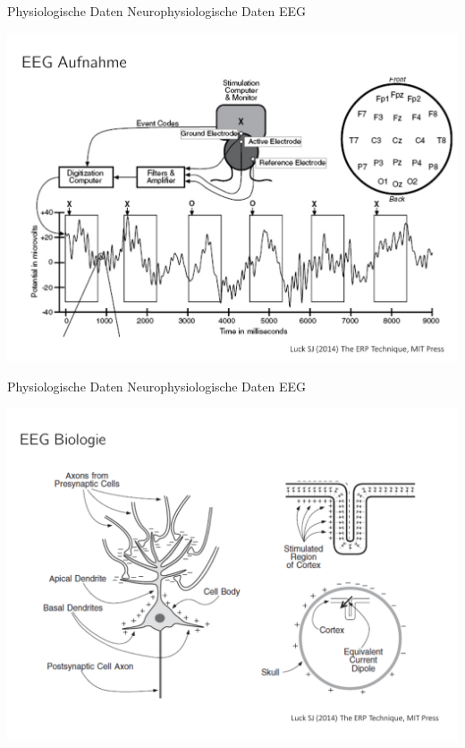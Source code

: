 \documentclass[
  8pt,
  ignorenonframetext,
]{beamer}
\begin{document}
\begin{frame}{Physiologische Daten}
\protect\hypertarget{physiologische-daten-4}{}
Neurophysiologische Daten \textbar{} EEG

\begin{center}\includegraphics[width=0.8\linewidth]{3_Abbildungen/pfm_3_eeg_aufnahme} \end{center}
\end{frame}

\begin{frame}{Physiologische Daten}
\protect\hypertarget{physiologische-daten-5}{}
Neurophysiologische Daten \textbar{} EEG

\begin{center}\includegraphics[width=0.8\linewidth]{3_Abbildungen/pfm_3_eeg_biologie} \end{center}
\end{frame}
\end{document}
